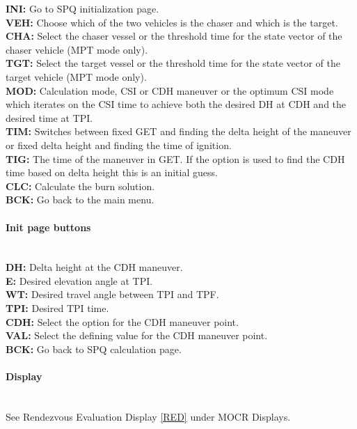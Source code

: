 \documentclass[11pt]{article} %
\begin{document}
\textbf{INI:} Go to SPQ initialization page.\\
\textbf{VEH:} Choose which of the two vehicles is the chaser and which is the target.\\
\textbf{CHA:} Select the chaser vessel or the threshold time for the state vector of the chaser vehicle (MPT mode only).\\
\textbf{TGT:} Select the target vessel or the threshold time for the state vector of the target vehicle (MPT mode only).\\
\textbf{MOD:} Calculation mode, CSI or CDH maneuver or the optimum CSI mode which iterates on the CSI time to achieve both the desired DH at CDH and the desired time at TPI.\\
\textbf{TIM:} Switches between fixed GET and finding the delta height of the maneuver or fixed delta height and finding the time of ignition.\\
\textbf{TIG:} The time of the maneuver in GET. If the option is used to find the CDH time based on delta height this is an initial guess.\\
\textbf{CLC:} Calculate the burn solution.\\
\textbf{BCK:} Go back to the main menu.\\

\paragraph{Init page buttons}\mbox{} \\

\textbf{DH:} Delta height at the CDH maneuver.\\
\textbf{E:} Desired elevation angle at TPI.\\
\textbf{WT:} Desired travel angle between TPI and TPF.\\
\textbf{TPI:} Desired TPI time.\\
\textbf{CDH:} Select the option for the CDH maneuver point.\\
\textbf{VAL:} Select the defining value for the CDH maneuver point.\\
\textbf{BCK:} Go back to SPQ calculation page.\\
\paragraph{Display}\mbox{} \\

See Rendezvous Evaluation Display \ref{RED} under MOCR Displays.\\
\newpage
\end{document}
